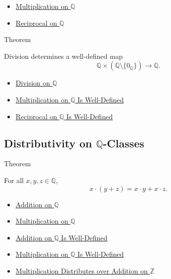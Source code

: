 \begin{dependencies}
\begin{itemize}
  \item \hyperref[def:multiplication-on-q-classes]{Multiplication on $\mathbb{Q}$}
  \item \hyperref[def:reciprocal-on-q-classes]{Reciprocal on $\mathbb{Q}$}
\end{itemize}
\end{dependencies}

\begin{theorembox}{Theorem}
\begin{theorem}
\label{thm:division-on-q-well-defined}
Division determines a well-defined map
\[
\mathbb{Q}\times(\mathbb{Q}\setminus\{0_{\mathbb{Q}}\})\to\mathbb{Q}.
\]
\end{theorem}
\end{theorembox}

\begin{dependencies}
\begin{itemize}
  \item \hyperref[def:division-on-q]{Division on $\mathbb{Q}$}
  \item \hyperref[thm:multiplication-on-q-well-defined]{Multiplication on $\mathbb{Q}$ Is Well-Defined}
  \item \hyperref[thm:reciprocal-on-q-well-defined]{Reciprocal on $\mathbb{Q}$ Is Well-Defined}
\end{itemize}
\end{dependencies}

\subsection*{\texorpdfstring{Distributivity on $\mathbb{Q}$-Classes}{Distributivity on Q-Classes}}

\begin{theorembox}{Theorem}
\begin{theorem}
\label{thm:left-distributivity-on-q}
For all $x,y,z\in\mathbb{Q}$,
\[
x\cdot(y+z)=x\cdot y+x\cdot z.
\]
\end{theorem}
\end{theorembox}

\begin{dependencies}
\begin{itemize}
  \item \hyperref[def:addition-on-q-classes]{Addition on $\mathbb{Q}$}
  \item \hyperref[def:multiplication-on-q-classes]{Multiplication on $\mathbb{Q}$}
  \item \hyperref[thm:addition-on-q-well-defined]{Addition on $\mathbb{Q}$ Is Well-Defined}
  \item \hyperref[thm:multiplication-on-q-well-defined]{Multiplication on $\mathbb{Q}$ Is Well-Defined}
  \item \hyperref[thm:multiplication-distributes-over-addition-on-z]{Multiplication Distributes over Addition on $\mathbb{Z}$}
\end{itemize}
\end{dependencies}


